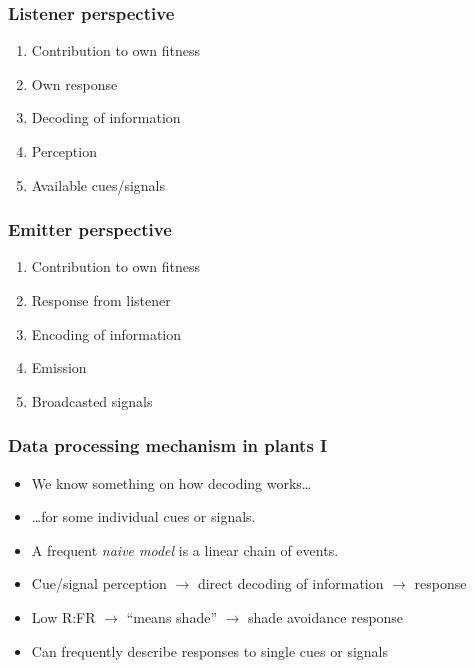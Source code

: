\documentclass[11pt]{beamer}\usepackage[]{graphicx}\usepackage[]{xcolor}
\begin{document}
\begin{frame}
\frametitle{Listener perspective}
\begin{enumerate}
  \item Contribution to own fitness
  \item Own response
  \item Decoding of information
  \item Perception
  \item Available cues/signals
\end{enumerate}
\end{frame}

\begin{frame}
\frametitle{Emitter perspective}
\begin{enumerate}
  \item Contribution to own fitness
  \item Response from listener
  \item Encoding of information
  \item Emission
  \item Broadcasted signals
\end{enumerate}
\end{frame}

\begin{frame}
\frametitle{Data processing mechanism in plants I}
\begin{itemize}
  \item We know something on how decoding works\ldots
  \item \ldots for some individual cues or signals.
  \item A frequent \emph{naive model} is a linear chain of events.
  \item Cue/signal perception $\rightarrow$ direct decoding of information $\rightarrow$ response
  \item Low R:FR $\rightarrow$ ``means shade'' $\rightarrow$ shade avoidance response
  \item Can frequently describe responses to single cues or signals
\end{itemize}
\end{frame}
\end{document}
